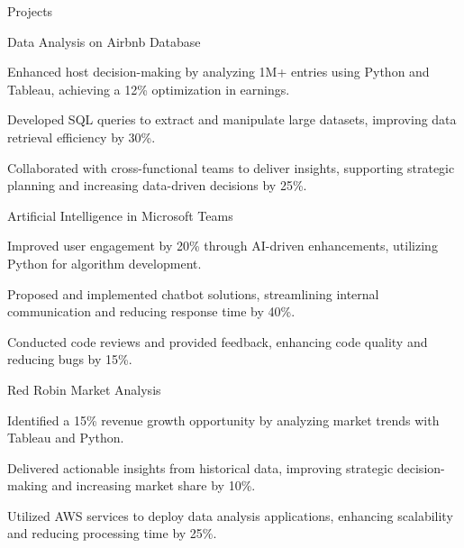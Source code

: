 \documentclass{resume} %
\begin{document}
    \begin{rSection}{Projects}
                    \begin{rSubsection}
                                    {Data Analysis on Airbnb Database}
                                {}{}{}
                                    \item Enhanced host decision{-}making by analyzing 1M+ entries using Python and Tableau, achieving a 12\% optimization in earnings.
                                    \item Developed SQL queries to extract and manipulate large datasets, improving data retrieval efficiency by 30\%.
                                    \item Collaborated with cross{-}functional teams to deliver insights, supporting strategic planning and increasing data{-}driven decisions by 25\%.
                            \end{rSubsection}
                    \begin{rSubsection}
                                    {Artificial Intelligence in Microsoft Teams}
                                {}{}{}
                                    \item Improved user engagement by 20\% through AI{-}driven enhancements, utilizing Python for algorithm development.
                                    \item Proposed and implemented chatbot solutions, streamlining internal communication and reducing response time by 40\%.
                                    \item Conducted code reviews and provided feedback, enhancing code quality and reducing bugs by 15\%.
                            \end{rSubsection}
                    \begin{rSubsection}
                                    {Red Robin Market Analysis}
                                {}{}{}
                                    \item Identified a 15\% revenue growth opportunity by analyzing market trends with Tableau and Python.
                                    \item Delivered actionable insights from historical data, improving strategic decision{-}making and increasing market share by 10\%.
                                    \item Utilized AWS services to deploy data analysis applications, enhancing scalability and reducing processing time by 25\%.
                            \end{rSubsection}
            \end{rSection}
\end{document}
